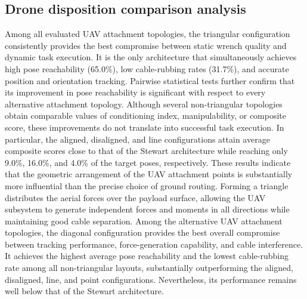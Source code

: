 \subsection{Drone disposition comparison analysis}
Among all evaluated UAV attachment topologies, the triangular configuration consistently provides the best compromise between static wrench quality and dynamic task execution. It is the only architecture that simultaneously achieves high pose reachability (65.0\%), low cable-rubbing rates (31.7\%), and accurate position and orientation tracking. Pairwise statistical tests further confirm that its improvement in pose reachability is significant with respect to every alternative attachment topology.
Although several non-triangular topologies obtain comparable values of conditioning index, manipulability, or composite score, these improvements do not translate into successful task execution. In particular, the aligned, disaligned, and line configurations attain average composite scores close to that of the Stewart architecture while reaching only 9.0\%, 16.0\%, and 4.0\% of the target poses, respectively.
These results indicate that the geometric arrangement of the UAV attachment points is substantially more influential than the precise choice of ground routing. Forming a triangle distributes the aerial forces over the payload surface, allowing the UAV subsystem to generate independent forces and moments in all directions while maintaining good cable separation. 
Among the alternative UAV attachment topologies, the diagonal configuration provides the best overall compromise between tracking performance, force-generation capability, and cable interference. It achieves the highest average pose reachability and the lowest cable-rubbing rate among all non-triangular layouts, substantially outperforming the aligned, disaligned, line, and point configurations. Nevertheless, its performance remains well below that of the Stewart architecture.

